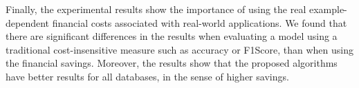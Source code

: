Finally, the experimental results show the importance of using the real example-dependent financial 
costs associated with real-world applications. We found that there are significant differences 
in the results when evaluating a model using a traditional cost-insensitive measure such as  
accuracy or F1Score, than when using the financial savings. Moreover, the results show that the 
proposed algorithms have better results for all databases, in the sense of higher savings.
